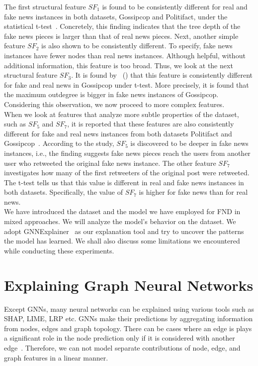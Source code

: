 The first structural feature $SF_1$ is found to be consistently different for real and fake news instances in both datasets, Gossipcop and Politifact, under the statistical t-test~\parencite{HierarchicalPropagationNetworksForFND_Shu}. Concretely, this finding indicates that the tree depth of the fake news pieces is larger than that of real news pieces. Next, another simple feature $SF_2$ is also shown to be consistently different. To specify, fake news instances have fewer nodes than real news instances. Although helpful, without additional information, this feature is too broad. Thus, we look at the next structural feature $SF_3$. It is found by~\citeauthor{HierarchicalPropagationNetworksForFND_Shu} (\citeyear{HierarchicalPropagationNetworksForFND_Shu}) that this feature is consistently different for fake and real news in Gossipcop under t-test. More precisely, it is found that the maximum outdegree is bigger in fake news instances of Gossipcop. Considering this observation, we now proceed to more complex features.\\
When we look at features that analyze more subtle properties of the dataset, such as $SF_5$ and $SF_7$, it is reported that these features are also consistently different for fake and real news instances from both datasets Politifact and Gossipcop~\parencite{HierarchicalPropagationNetworksForFND_Shu}. According to the study, $SF_5$ is discovered to be deeper in fake news instances, i.e., the finding suggests fake news pieces reach the users from another user who retweeted the original fake news instance. The other feature $SF_7$ investigates how many of the first retweeters of the original post were retweeted. The t-test tells us that this value is different in real and fake news instances in both datasets. Specifically, the value of $SF_7$ is higher for fake news than for real news.\\
We have introduced the dataset and the model we have employed for FND in mixed approaches. We will analyze the model's behavior on the dataset. We adopt GNNExplainer~\parencite{GNNExplainer_Ying} as our explanation tool and try to uncover the patterns the model has learned. We shall also discuss some limitations we encountered while conducting these experiments.

\section{Explaining Graph Neural Networks}
\label{sec:ExplainingGNNs}
Except GNNs, many neural networks can be explained using various tools such as SHAP, LIME, LRP etc. GNNs
make their predictions by aggregating information from nodes, edges and graph topology. There can be cases where an edge
is plays a significant role in the node prediction only if it is considered with another edge~\parencite{CNNsOnGraphsForLearningMolecularFingerprints_Duvenaud}. Therefore, we can not model separate contributions of node,
edge, and graph features in a linear manner.\\

